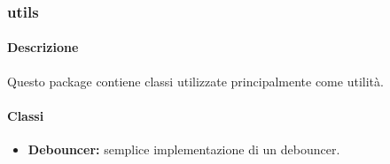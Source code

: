 	\subsubsection{utils}
		
		\paragraph*{Descrizione}
			Questo package contiene classi utilizzate principalmente come utilità.
		
		\paragraph*{Classi}
			\begin{itemize}
				\item \textbf{Debouncer:} semplice implementazione di un debouncer.
			\end{itemize}					
		